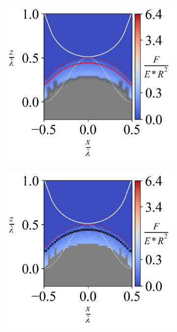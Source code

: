\begin{figure}[H]
    
    \begin{subfigure}{0.32\textwidth}
        \centering
        \caption{\label{fig: All-Wave-ContourPlot-9}}
        \includegraphics[width=1\linewidth]{Figures/Wave-ContourPlot-9.png}
    \end{subfigure}  
    \hfill
        \begin{subfigure}{0.32\textwidth}
        \centering
        \caption{\label{fig: All-Wave-ContourPlotNI-9}}
        \includegraphics[width=1\linewidth]{Figures/Wave-ContourPlotNI-9.png}

\end{subfigure}
\end{figure}

